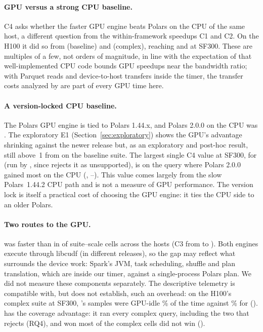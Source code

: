 \documentclass[11pt]{article}
\begin{document}
\paragraph{GPU versus a strong CPU baseline.} C4 asks whether the faster GPU
engine beats Polars on the CPU of the same host, a different question from the
within-framework speedups C1 and C2. On the H100 it did so from
 (baseline) and
 (complex), reaching
 and  at SF300. These
are multiples of a few, not orders of magnitude, in line with the expectation
of \citet{shanbhag2020gpucpu} that well-implemented CPU code bounds GPU speedups
near the bandwidth ratio; with Parquet reads and device-to-host transfers inside
the timer, the transfer costs analyzed by \citet{lutz2020pump} are part of
every GPU time here.

\paragraph{A version-locked CPU baseline.} The Polars GPU engine is tied to
Polars 1.44.x, and Polars 2.0.0 on the CPU was . The
exploratory E1 (Section~\ref{sec:exploratory}) shows the GPU's advantage
shrinking against the newer release but, as an exploratory and post-hoc result,
still above~1 from  on the baseline
suite. The largest single C4 value at SF300,
 for  (run by \sparkgpu{},
since \polarsgpu{} rejects it as unsupported), is on the query where Polars 2.0.0 gained
most on the CPU (,
--).
This value comes largely from the slow Polars~1.44.2 CPU path and is not a
measure of GPU performance. The version lock is itself a practical cost of
choosing the GPU engine: it ties the CPU side to an older Polars.

\paragraph{Two routes to the GPU.} \polarsgpu{} was faster than \sparkgpu{} in
 of  suite--scale cells across
the hosts (C3 from  to ). Both engines
execute through libcudf (in different releases), so the gap may reflect what
surrounds the device work: Spark's JVM, task scheduling, shuffle and plan
translation, which are inside our timer, against a single-process Polars plan.
We did not measure these components separately. The descriptive telemetry is
compatible with, but does not establish, such an overhead: on the H100's
complex suite at SF300, \sparkgpu{}'s samples were GPU-idle
\% of the time against
\% for \polarsgpu{}
(). \sparkgpu{} has the
coverage advantage: it ran every complex query, including the two that
\polarsgpu{} rejects (RQ4), and won most of the complex cells \polarsgpu{} did
not win ().
\end{document}
